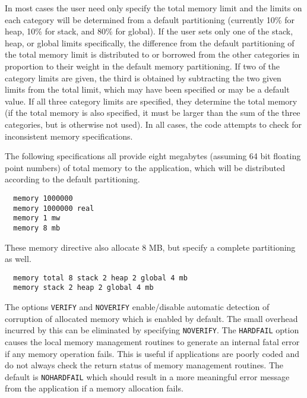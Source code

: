 In most cases the user need only specify the total memory limit and
the limits on each category will be determined from a default
partitioning (currently 10\% for heap, 10\% for stack, and 80\% for
global).  If the user sets only one of the stack, heap, or global
limits specifically, the difference from the default partitioning of
the total memory limit is distributed to or borrowed from the other
categories in proportion to their weight in the default memory
partitioning.  If two of the category limits are given, the third is
obtained by subtracting the two given limits from the total limit,
which may have been specified or may be a default value.  If all three
category limits are specified, they determine the total memory (if the
total memory is also specified, it must be larger than the sum of the
three categories, but is otherwise not used).  In all cases, the code
attempts to check for inconsistent memory specifications.

The following specifications all provide eight megabytes (assuming 64
bit floating point numbers) of total memory to the application, which
will be distributed according to the default partitioning.
\begin{verbatim}
  memory 1000000
  memory 1000000 real
  memory 1 mw
  memory 8 mb
\end{verbatim}
These memory directive also allocate 8 MB, but specify a complete
partitioning as well.
\begin{verbatim}
  memory total 8 stack 2 heap 2 global 4 mb
  memory stack 2 heap 2 global 4 mb
\end{verbatim}
The options \verb+VERIFY+ and \verb+NOVERIFY+ enable/disable automatic
detection of corruption of allocated memory which is enabled by
default. The small overhead incurred by this can be eliminated by
specifying \verb+NOVERIFY+.  The \verb+HARDFAIL+ option causes the
local memory management routines to generate an internal fatal error
if any memory operation fails.  This is useful if applications are
poorly coded and do not always check the return status of memory
management routines.  The default is \verb+NOHARDFAIL+ which should
result in a more meaningful error message from the application if a
memory allocation fails.

